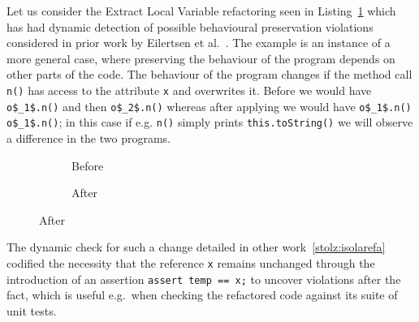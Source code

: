 \newcommand\mcall[1]{\lstinline[style=smallJava]|#1|}

Let us consider the Extract Local Variable refactoring seen in Listing~\ref{lst:ExtractVariable-java} which has had dynamic detection of
possible behavioural preservation violations considered in prior work by Eilertsen et al.~\cite{stolz:isolarefa}.
The example is an instance of a more general case, where preserving the behaviour of the program depends on other parts of the code.
The behaviour of the program changes if the method call \mcall{n()} has access to the attribute \mcall{x} and overwrites it.
Before we would have  \lstinline[mathescape=true,style=smallJava]|o$_1$.n()| and then
\lstinline[mathescape=true,style=smallJava]|o$_2$.n()| whereas after applying  we would have \lstinline[mathescape=true,style=smallJava]|o$_1$.n()|
 \lstinline[mathescape=true,style=smallJava]|o$_1$.n()|; in this case if e.g. \lstinline[mathescape=true,style=smallJava]|n()|
simply prints \lstinline[mathescape=true,style=smallJava]|this.toString()| we will observe a difference in the two programs.

\begin{figure}[!h]
  \centering
  \begin{subfigure}{.2\linewidth}
    
    \caption{Before}
  \end{subfigure}\hspace{1cm}
  \begin{subfigure}{.3\linewidth}
    
    \caption{After}
  \end{subfigure}
\label{lst:ExtractVariable-java}
\end{figure}

The dynamic check for such a change detailed in other work~\ref{stolz:isolarefa} codified the necessity that the reference \lstinline[style=smallJava]|x|
remains unchanged through the introduction of an assertion \lstinline[style=smallJava]|assert temp == x;| to uncover violations after the fact,
which is useful e.g.\ when checking the refactored code against its suite of unit tests.

